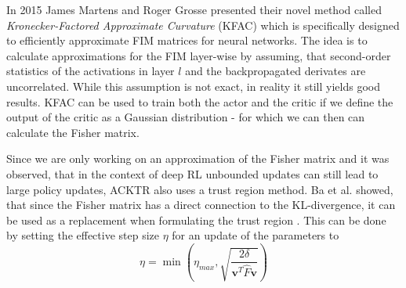 In 2015 James Martens and Roger Grosse presented their novel method called \textit{Kronecker-Factored Approximate Curvature} (KFAC) \cite{martens2015optimizing} which is specifically designed to efficiently approximate FIM matrices for neural networks. The idea is to calculate approximations for the FIM layer-wise by assuming, that second-order statistics of the activations in layer $l$ and the backpropagated derivates are uncorrelated. While this assumption is not exact, in reality it still yields good results. KFAC can be used to train both the actor and the critic if we define the output of the critic as a Gaussian distribution - for which we can then can calculate the Fisher matrix. 



Since we are only working on an approximation of the Fisher matrix and it was observed, that in the context of deep RL unbounded updates can still lead to large policy updates, ACKTR also uses a trust region method. Ba et al. showed, that since the Fisher matrix has a direct connection to the KL-divergence, it can be used as a replacement when formulating the trust region \cite{ba2016distributed}. This can be done by setting the effective step size $\eta$ for an update of the parameters to 
\[\eta = \min\left(\eta_{max}, \sqrt{\frac{2\delta}{\mathbf{v}^T\hat{F}\mathbf{v}}}\right)\]

